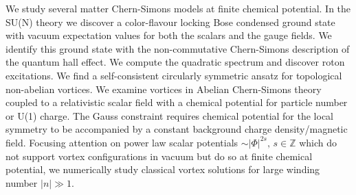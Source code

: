 


\begin{abstracts}        %

\begin{singlespace}
    We study several matter Chern-Simons models at finite chemical potential. In the SU(N) theory we discover a color-flavour locking Bose condensed ground state with vacuum expectation values for both the scalars and the gauge fields. We identify this ground state with the non-commutative Chern-Simons description of the quantum hall effect. We compute the quadratic spectrum and discover roton excitations. We find a self-consistent circularly symmetric ansatz for topological non-abelian vortices. We examine vortices in Abelian Chern-Simons theory coupled to a relativistic scalar field with a chemical potential for particle number or U(1) charge. The Gauss constraint requires chemical potential for the local symmetry to be accompanied by a constant background charge density/magnetic field. Focusing attention on power law scalar potentials $∼ |\Phi|^{2s}, \, s\in \mathbb{Z}$ which do not support vortex configurations in vacuum but do so at finite chemical potential, we numerically study classical vortex solutions for large winding number $|n|\gg  1$.
\end{singlespace}

\end{abstracts}


